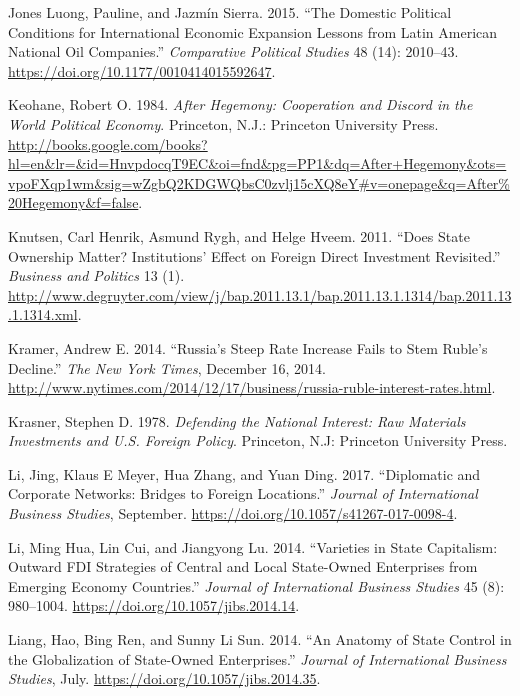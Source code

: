 \documentclass[11pt,]{book}
\begin{document}
\leavevmode\hypertarget{ref-jones_luong_domestic_2015}{}%
Jones Luong, Pauline, and Jazmín Sierra. 2015. ``The Domestic Political Conditions for International Economic Expansion Lessons from Latin American National Oil Companies.'' \emph{Comparative Political Studies} 48 (14): 2010--43. \url{https://doi.org/10.1177/0010414015592647}.

\leavevmode\hypertarget{ref-keohane_after_1984}{}%
Keohane, Robert O. 1984. \emph{After Hegemony: Cooperation and Discord in the World Political Economy}. Princeton, N.J.: Princeton University Press. \url{http://books.google.com/books?hl=en\&lr=\&id=HnvpdocqT9EC\&oi=fnd\&pg=PP1\&dq=After+Hegemony\&ots=vpoFXqp1wm\&sig=wZgbQ2KDGWQbsC0zvlj15cXQ8eY\#v=onepage\&q=After\%20Hegemony\&f=false}.

\leavevmode\hypertarget{ref-knutsen_does_2011}{}%
Knutsen, Carl Henrik, Asmund Rygh, and Helge Hveem. 2011. ``Does State Ownership Matter? Institutions' Effect on Foreign Direct Investment Revisited.'' \emph{Business and Politics} 13 (1). \url{http://www.degruyter.com/view/j/bap.2011.13.1/bap.2011.13.1.1314/bap.2011.13.1.1314.xml}.

\leavevmode\hypertarget{ref-kramer_russias_2014}{}%
Kramer, Andrew E. 2014. ``Russia's Steep Rate Increase Fails to Stem Ruble's Decline.'' \emph{The New York Times}, December 16, 2014. \url{http://www.nytimes.com/2014/12/17/business/russia-ruble-interest-rates.html}.

\leavevmode\hypertarget{ref-krasner_defending_1978}{}%
Krasner, Stephen D. 1978. \emph{Defending the National Interest: Raw Materials Investments and U.S. Foreign Policy}. Princeton, N.J: Princeton University Press.

\leavevmode\hypertarget{ref-li_diplomatic_2017}{}%
Li, Jing, Klaus E Meyer, Hua Zhang, and Yuan Ding. 2017. ``Diplomatic and Corporate Networks: Bridges to Foreign Locations.'' \emph{Journal of International Business Studies}, September. \url{https://doi.org/10.1057/s41267-017-0098-4}.

\leavevmode\hypertarget{ref-li_varieties_2014}{}%
Li, Ming Hua, Lin Cui, and Jiangyong Lu. 2014. ``Varieties in State Capitalism: Outward FDI Strategies of Central and Local State-Owned Enterprises from Emerging Economy Countries.'' \emph{Journal of International Business Studies} 45 (8): 980--1004. \url{https://doi.org/10.1057/jibs.2014.14}.

\leavevmode\hypertarget{ref-liang_anatomy_2014}{}%
Liang, Hao, Bing Ren, and Sunny Li Sun. 2014. ``An Anatomy of State Control in the Globalization of State-Owned Enterprises.'' \emph{Journal of International Business Studies}, July. \url{https://doi.org/10.1057/jibs.2014.35}.
\end{document}
